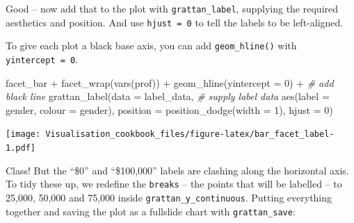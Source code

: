 \documentclass[
]{book}
\newenvironment{Shaded}{\begin{snugshade}}{\end{snugshade}}
\newcommand{\AttributeTok}[1]{\textcolor[rgb]{0.77,0.63,0.00}{#1}}
\newcommand{\CommentTok}[1]{\textcolor[rgb]{0.56,0.35,0.01}{\textit{#1}}}
\newcommand{\DecValTok}[1]{\textcolor[rgb]{0.00,0.00,0.81}{#1}}
\newcommand{\FunctionTok}[1]{\textcolor[rgb]{0.00,0.00,0.00}{#1}}
\newcommand{\NormalTok}[1]{#1}
\newcommand{\SpecialCharTok}[1]{\textcolor[rgb]{0.00,0.00,0.00}{#1}}
\begin{document}
Good -- now add that to the plot with \texttt{grattan\_label}, supplying the required aesthetics and position. And use \texttt{hjust\ =\ 0} to tell the labels to be left-aligned.

To give each plot a black base axis, you can add \texttt{geom\_hline()} with \texttt{yintercept\ =\ 0}.

\begin{Shaded}
\begin{Highlighting}[]
\NormalTok{facet\_bar }\SpecialCharTok{+}
  \FunctionTok{facet\_wrap}\NormalTok{(}\FunctionTok{vars}\NormalTok{(prof)) }\SpecialCharTok{+} 
  \FunctionTok{geom\_hline}\NormalTok{(}\AttributeTok{yintercept =} \DecValTok{0}\NormalTok{) }\SpecialCharTok{+}  \CommentTok{\# add black line}
  \FunctionTok{grattan\_label}\NormalTok{(}\AttributeTok{data =}\NormalTok{ label\_data, }\CommentTok{\# supply label data}
                \FunctionTok{aes}\NormalTok{(}\AttributeTok{label =}\NormalTok{ gender,}
                    \AttributeTok{colour =}\NormalTok{ gender),}
                \AttributeTok{position =} \FunctionTok{position\_dodge}\NormalTok{(}\AttributeTok{width =} \DecValTok{1}\NormalTok{), }
                \AttributeTok{hjust =} \DecValTok{0}\NormalTok{)}
\end{Highlighting}
\end{Shaded}

\texttt{[image: Visualisation\_cookbook\_files/figure-latex/bar\_facet\_label-1.pdf]}

Class! But the ``\$0'' and ``\$100,000'' labels are clashing along the horizontal axis. To tidy these up, we redefine the \texttt{breaks} -- the points that will be labelled -- to 25,000, 50,000 and 75,000 inside \texttt{grattan\_y\_continuous}. Putting everything together and saving the plot as a fullslide chart with \texttt{grattan\_save}:
\end{document}

